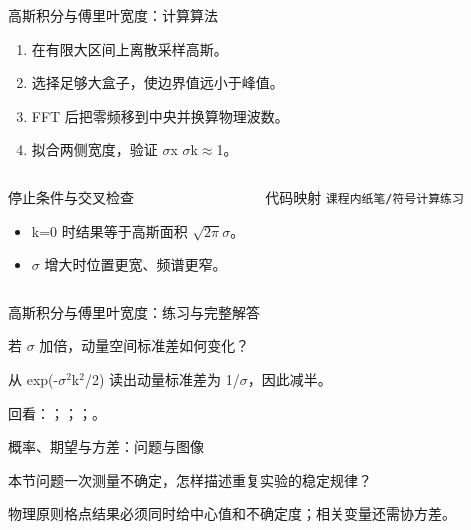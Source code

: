 \begin{frame}[t]{高斯积分与傅里叶宽度：计算算法}
\footnotesize
{}\begin{enumerate}
\item 在有限大区间上离散采样高斯。
\item 选择足够大盒子，使边界值远小于峰值。
\item FFT 后把零频移到中央并换算物理波数。
\item 拟合两侧宽度，验证 \ensuremath{\sigma}x \ensuremath{\sigma}k\ensuremath{\approx}1。
\end{enumerate}\begin{columns}[T,onlytextwidth]
\begin{block}{停止条件与交叉检查}\scriptsize\begin{itemize}
\item[\CheckMark] k=0 时结果等于高斯面积 \ensuremath{\sqrt{2\pi}}\ensuremath{\sigma}。
\item[\CheckMark] \ensuremath{\sigma} 增大时位置更宽、频谱更窄。
\end{itemize}\end{block}
\begin{block}{代码映射}
\scriptsize \texttt{课程内纸笔/\allowbreak{}符号计算练习}
\end{block}\end{columns}\end{frame}

\begin{frame}[t]{高斯积分与傅里叶宽度：练习与完整解答}
\footnotesize
\begin{block}{}若 \ensuremath{\sigma} 加倍，动量空间标准差如何变化？\end{block}
\begin{exampleblock}{}从 exp(-\ensuremath{\sigma}\ensuremath{^{2}}k\ensuremath{^{2}}/\allowbreak{}2) 读出动量标准差为 1/\allowbreak{}\ensuremath{\sigma}，因此减半。\end{exampleblock}
\vfill
\scriptsize 回看：；；；。
\end{frame}

\begin{frame}[t]{概率、期望与方差：问题与图像}
\footnotesize
\begin{block}{本节问题}一次测量不确定，怎样描述重复实验的稳定规律？\end{block}
\begin{block}{物理原则}\quad 格点结果必须同时给中心值和不确定度；相关变量还需协方差。\end{block}
\end{frame}

